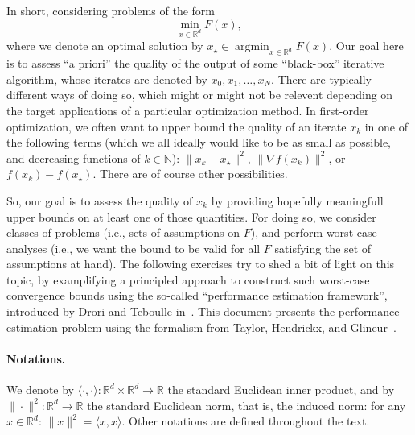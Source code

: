 \documentclass[11pt,a4paper]{article}
\newcommand{\inner}[2]{{\langle #1, #2\rangle}}
\DeclareMathOperator*{\argmin}{argmin}
\begin{document}
	In short, considering problems of the form \[\min_{x\in\mathbb{R}^d} F(x),\] where we denote an optimal solution by $x_\star\in\argmin_{x\in\mathbb{R}^d} F(x)$. Our goal here is to assess ``a priori'' the quality of the output of some ``black-box'' iterative algorithm, whose iterates are denoted by $x_0,x_1,\ldots,x_N$. There are typically different ways of doing so, which might or might not be relevent depending on the target applications of a particular optimization method. In first-order optimization, we often want to upper bound the quality of an iterate $x_k$ in one of the following terms (which we all ideally would like to be as small as possible, and decreasing functions of $k\in\mathbb{N}$): $\|x_k-x_\star\|^2$, $\|\nabla f(x_k)\|^2$, or $f(x_k)-f(x_\star)$. There are of course other possibilities.

So, our goal is to assess the quality of $x_k$ by providing hopefully meaningfull upper bounds on at least one of those quantities. For doing so, we consider classes of problems (i.e., sets of assumptions on $F$), and perform worst-case analyses (i.e., we want the bound to be valid for all $F$ satisfying the set of assumptions at hand). The following exercises try to shed a bit of light on this topic, by examplifying a principled approach to construct such worst-case convergence bounds using the so-called ``performance estimation framework'', introduced by Drori and Teboulle in~\cite{drori2014performance}. This document presents the performance estimation problem using the formalism from Taylor, Hendrickx, and Glineur~\cite{taylor2015exact,taylor2015smooth}.

\paragraph{Notations.} We denote by $\inner{\cdot}{\cdot}:\mathbb{R}^d\times \mathbb{R}^d\rightarrow\mathbb{R} $ the standard Euclidean inner product, and by $\|\cdot \|^2:\mathbb{R}^d\rightarrow\mathbb{R}$ the standard Euclidean norm, that is, the induced norm: for any $x\in\mathbb{R}^d$: $\|x\|^2=\inner{x}{x}$. Other notations are defined throughout the text.
\end{document}
